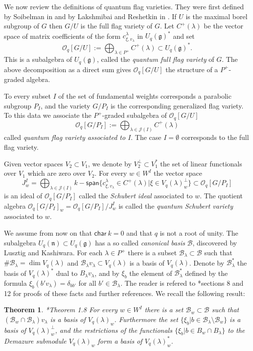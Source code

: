 \documentclass[11pt,fleqn]{article}
\theoremstyle{plain}
\newtheorem{Theorem}{Theorem}[section]
\theoremstyle{remark}
\theoremstyle{definition}
\newcommand\B{\mathcal B}
\renewcommand\O{\mathcal O}
\newcommand\g{\mathfrak g}
\newcommand\n{\mathfrak n}
\begin{document}
We now review the definitions of quantum flag varieties. They were first defined by
Soibelman in \cite{S} and by Lakshmibai and Reshetkin in \cite{LR}.
If $U$ is the maximal borel subgroup of $G$ then $G/U$ is the full flag variety of $G$.
Let $C^+(\lambda)$ be the vector space of matrix coefficients of the form
$c^\lambda_{\xi,v_{\lambda}}$ in $U_q(\g)^*$ and set 
$$\O_q[G/U] := \bigoplus_{\lambda \in P^+} C^+(\lambda) \subset U_q(\g)^*.$$
This is a subalgebra of $U_q(\g)$, called the \emph{quantum full flag variety} of $G$. The 
above decomposition as a direct sum gives $\O_q[G/U]$ the structure of a $P^+$-graded
algebra.

To every subset $I$ of the set of fundamental weights corresponds a parabolic subgroup
$P_I$, and the variety $G/P_I$ is the corresponding generalized flag variety. To this data 
we associate the $P^+$-graded subalgebra of $\O_q[G/U]$
$$\O_q[G/P_I]:= \bigoplus_{\lambda \in \mathcal J(I)} C^+(\lambda)$$
called \emph{quantum flag variety associated to $I$}. The case $I = \emptyset$
corresponds to the full flag variety.

Given vector spaces $V_2 \subset V_1$, we denote by $V_2^\perp \subset V_1^*$ the set of
linear functionals over $V_1$ which are zero over $V_2$. For every $w \in W^I$ the vector
space 
$$J_w^I = \bigoplus_{\lambda \in \mathcal J(I)} k-\mathsf{span}\{c_{\xi,v_\lambda}^\lambda \in C^+(\lambda)|\xi  \in V_q(\lambda)_w^\perp \} \subset \O_q[G/P_I]$$ 
is an ideal of $\O_q[G/P_I]$ called the \emph{Schubert ideal} associated to $w$. The
quotient algebra $\O_q[G/P_I]_w = \O_q[G/P_I]/J^I_w$ is called the \emph{quantum Schubert
variety} associated to $w$.

We assume from now on that $\mathsf{char}\ k = 0$ and that $q$ is not a root of unity.
The subalgebra $U_q(\n) \subset U_q(\g)$ has a so called \emph{canonical basis} $\B$,
discovered by Lusztig and Kashiwara. For each $\lambda \in P^+$ there is a subset
$\B_\lambda \subset \B$ such that $\# \B_\lambda = \dim V_q(\lambda)$ and $\B_\lambda
v_\lambda \subset V_q(\lambda)$ is a basis of $V_q(\lambda)$. Denote by $\B_\lambda^*$ the
basis of $V_q(\lambda)^*$ dual to $B_\lambda v_\lambda$, and by $\xi_b$ the element of
$\B_\lambda^*$ defined by the formula $\xi_b(b'v_\lambda) = \delta_{bb'}$ for all $b' \in
\B_\lambda$. The reader is refered to \cite{K}*{sections 8 and 12} for proofs of these facts
and further references. We recall the following result:

\begin{Theorem}\cite{C}*{Theorem 1.8}
\label{Demazure-basis}
	For every $w \in W^I$ there is a set $\B_w \subset \B$ such that $(\B_w \cap
	\B_\lambda)v_\lambda$ is a basis of $V_q(\lambda)_w$. Furthermore the set
	$\{\xi_b| b \in \B_\lambda \setminus \B_w \}$ is a basis of
	$V_q(\lambda)_w^\perp$, and the restrictions of the functionals $\{\xi_b|b \in B_w \cap
	B_\lambda\}$ to the Demazure submodule $V_q(\lambda)_w$ form a basis of $V_q(\lambda)_w^*$.
\end{Theorem}
\end{document}
